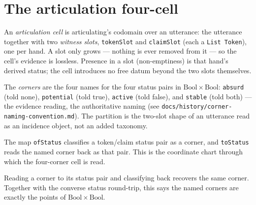 \section{The articulation four-cell}

\begin{proposition}\label{thm:articulation-cell}\leanok{}
An \emph{articulation cell} is articulating's codomain over an utterance: the
utterance together with two \emph{witness slots}, \texttt{tokenSlot} and
\texttt{claimSlot} (each a \texttt{List Token}), one per hand. A slot only
grows --- nothing is ever removed from it --- so the cell's evidence is
lossless. Presence in a slot (non-emptiness) is that hand's derived status;
the cell introduces no free datum beyond the two slots themselves.
\end{proposition}

\begin{proposition}\label{thm:corner}\leanok{}
The \emph{corners} are the four names for the four status pairs in
$\mathrm{Bool}\times\mathrm{Bool}$: \texttt{absurd} (told none),
\texttt{potential} (told true), \texttt{active} (told false), and
\texttt{stable} (told both) — the evidence reading, the authoritative naming
(see \texttt{docs/history/corner-naming-convention.md}). The partition is the
two-slot shape of an utterance read as an incidence object, not an added
taxonomy.
\end{proposition}

\begin{proposition}\label{thm:status-correspondence}\leanok{}
The map \texttt{ofStatus} classifies a token/claim status pair as a corner,
and \texttt{toStatus} reads the named corner back as that pair. This is the
coordinate chart through which the four-corner cell is read.
\end{proposition}

\begin{lemma}\label{thm:corner-iso}\leanok{}
Reading a corner to its status pair and classifying back recovers the same
corner. Together with the converse status round-trip, this says the named
corners are exactly the points of $\mathrm{Bool}\times\mathrm{Bool}$.
\end{lemma}

